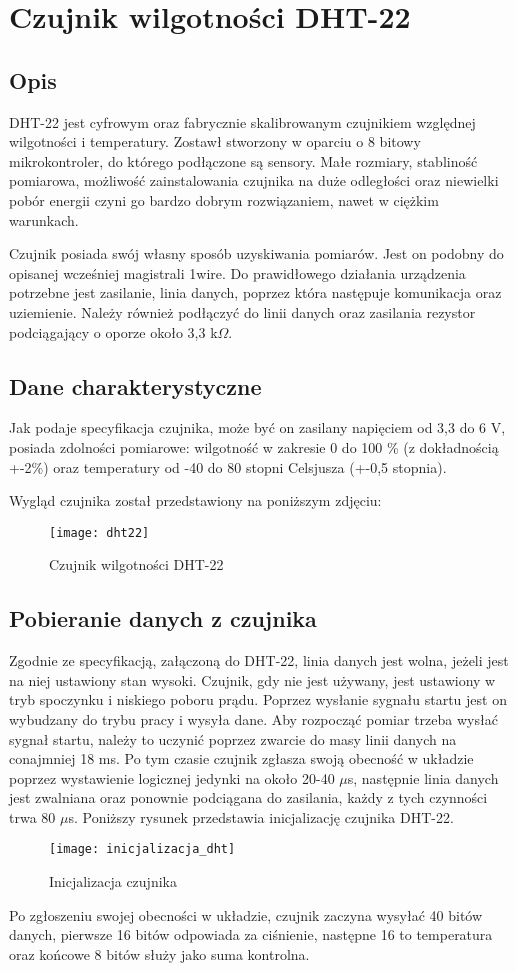 \chapter{Czujnik wilgotności DHT-22}
\section*{Opis}
DHT-22 jest cyfrowym oraz fabrycznie skalibrowanym czujnikiem względnej wilgotności i temperatury. Zostawł stworzony w oparciu o 8 bitowy mikrokontroler, do którego podłączone są sensory. Małe rozmiary, stabliność pomiarowa, możliwość zainstalowania czujnika na duże odległości oraz niewielki pobór energii czyni go bardzo dobrym rozwiązaniem, nawet w ciężkim warunkach.

Czujnik posiada swój własny sposób uzyskiwania pomiarów. Jest on podobny do opisanej wcześniej magistrali 1wire. Do prawidłowego działania urządzenia potrzebne jest zasilanie, linia danych, poprzez która następuje komunikacja oraz uziemienie. Należy również podłączyć do linii danych oraz zasilania rezystor podciągający o oporze około 3,3 k$\Omega$.
\section*{Dane charakterystyczne}
Jak podaje specyfikacja czujnika, może być on zasilany napięciem od 3,3 do 6 V, posiada zdolności pomiarowe: wilgotność w zakresie 0 do 100 \% (z dokładnością +-2\%) oraz temperatury od -40 do 80 stopni Celsjusza (+-0,5 stopnia).

Wygląd czujnika został przedstawiony na poniższym zdjęciu:
\begin{figure}[h]
\centering
\texttt{[image: dht22]}
\caption{Czujnik wilgotności DHT-22}
\label{fig:dht22}
\end{figure}
\section*{Pobieranie danych z czujnika}
Zgodnie ze specyfikacją, załączoną do DHT-22, linia danych jest wolna, jeżeli jest na niej ustawiony stan wysoki. Czujnik, gdy nie jest używany, jest ustawiony w tryb spoczynku i niskiego poboru prądu. Poprzez wysłanie sygnału startu jest on wybudzany do trybu pracy i wysyła dane. Aby rozpocząć pomiar trzeba wysłać sygnał startu, należy to uczynić poprzez zwarcie do masy linii danych na conajmniej 18 ms. Po tym czasie czujnik zgłasza swoją obecność w układzie poprzez wystawienie logicznej jedynki na około 20-40 $\mu$s, następnie linia danych jest zwalniana oraz ponownie podciągana do zasilania, każdy z tych czynności trwa 80 $\mu$s. Poniższy rysunek przedstawia inicjalizację czujnika DHT-22.
\begin{figure}[h]
\centering
\texttt{[image: inicjalizacja\_dht]}
\caption{Inicjalizacja czujnika}
\label{fig:inicjalizacja_dht}
\end{figure}
Po zgłoszeniu swojej obecności w układzie, czujnik zaczyna wysyłać 40 bitów danych, pierwsze 16 bitów odpowiada za ciśnienie, następne 16 to temperatura oraz końcowe 8 bitów służy jako suma kontrolna.


